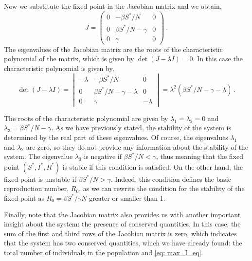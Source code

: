 Now we substitute the fixed point in the Jacobian matrix and we obtain,
\begin{equation}
  J=\begin{pmatrix}
    0 & -\beta S^*/N       & 0 \\
    0 & \beta S^*/N-\gamma & 0 \\
    0 & \gamma             & 0
  \end{pmatrix} \ .
\end{equation}
The eigenvalues of the Jacobian matrix are the roots of the characteristic
polynomial of the matrix, which is given by $\det(J-\lambda I)=0$. In this case
the characteristic polynomial is given by,
\begin{equation}
  \det(J-\lambda I)=\begin{vmatrix}
    -\lambda & -\beta S^*/N                & 0        \\
    0        & \beta S^*/N-\gamma -\lambda & 0        \\
    0        & \gamma                      & -\lambda
  \end{vmatrix}=\lambda^2(\beta S^*/N-\gamma-\lambda) \ .
\end{equation}

The roots of the characteristic polynomial are given by $\lambda_1=\lambda_2=0$
and $\lambda_3=\beta S^*/N-\gamma$. As we have previously stated, the stability
of the system is determined by the real part of these eigenvalues. Of course,
the eigenvalues $\lambda_1$ and $\lambda_2$ are zero, so they do not provide
any information about the stability of the system. The eigenvalue $\lambda_3$
is negative if $\beta S^*/N<\gamma$, thus meaning that the fixed point
$(S^*,I^*,R^*)$ is stable if this condition is satisfied. On the other hand,
the fixed point is unstable if $\beta S^*/N>\gamma$. Indeed, this condition
defines the basic reproduction number, $R_0$, as we can rewrite the condition
for the stability of the fixed point as $R_0=\beta S^*/\gamma N$ greater or
smaller than 1.

Finally, note that the Jacobian matrix also provides us with another important
insight about the system: the presence of conserved quantities. In this case,
the sum of the first and third rows of the Jacobian matrix is zero, which
indicates that the system has two conserved quantities, which we have already
found: the total number of individuals in the population and \cref{eq:
  max_I_eq}.

